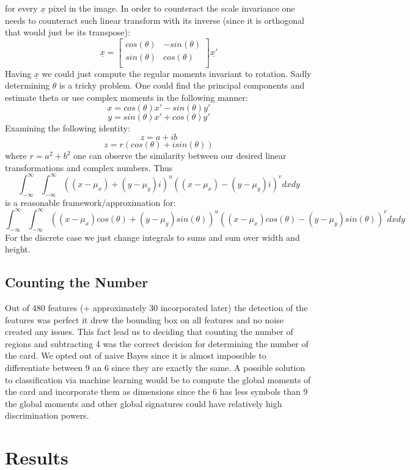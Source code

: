 \documentclass[11pt]{article}
\theoremstyle{plain}
\theoremstyle{definition}
\begin{document}
for every $\underline{x}$ pixel in the image. In order to counteract the scale invariance one needs to counteract such linear transform with its inverse (since it is orthogonal that would just be its transpose):
\[
\underline{x}=
\begin{bmatrix}
  cos(\theta) & -sin(\theta) \\
  sin(\theta) & cos(\theta)  \\
 \end{bmatrix} \underline{x'}
\]
Having $\underline{x}$ we could just compute the regular moments invariant to rotation. Sadly determining $\theta$ is a tricky problem. One could find the principal components and estimate theta or use complex moments in the following manner:
\[
x = cos(\theta)x' - sin(\theta)y'
\]
\[
y = sin(\theta)x' + cos(\theta)y'
\]
Examining the following identity:
\[
z = a + ib 
\]
\[
z = r(cos(\theta) + isin(\theta))
\]
where $r = a^{2}+b^{2}$ one can observe the similarity between our desired linear transformations and complex numbers.
Thus 
\[
\int^{\infty}_{-\infty}\int^{\infty}_{-\infty}((x -\mu_{x})+(y - \mu_{y})i)^{u}((x -\mu_{x})-(y - \mu_{y})i)^{v}dxdy
\]
is a reasonable framework/approximation for:
\[
\int^{\infty}_{-\infty}\int^{\infty}_{-\infty}((x -\mu_{x})cos(\theta)+(y - \mu_{y})sin(\theta))^{u}((x -\mu_{x})cos(\theta)-(y - \mu_{y})sin(\theta))^{v}dxdy
\]
For the discrete case we just change integrals
to sums and sum over width and height.

\subsection{Counting the Number}
Out of 480 features (+ approximately 30 incorporated later) the detection of the features was perfect it drew the bounding box  on all features and no noise created any issues. This fact lead us to deciding that counting the number of regions and subtracting 4 was the correct decision for determining the number of the card. We opted out of naive Bayes since it is almost impossible to differentiate between 9 an 6 since they are exactly the same. A possible solution to classification via machine learning would be to compute the global moments of the card and incorporate them as dimensions since the 6 has less symbols than 9 the global moments and other global signatures could have relatively high discrimination powers.
\section{Results}
\end{document}
